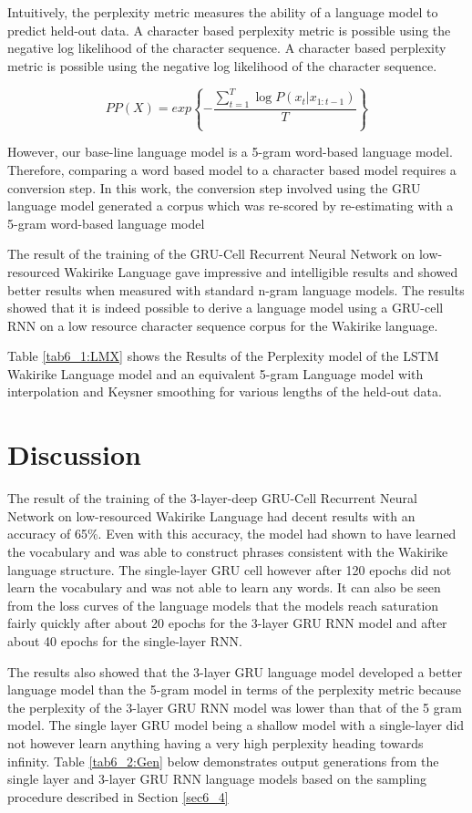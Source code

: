 Intuitively, the perplexity metric measures the ability of a language model to predict held-out data.  A character based perplexity metric is possible using  the negative log likelihood of the character sequence.  A character based perplexity metric is possible using  the negative log likelihood of the character sequence.

\begin{equation}
    PP(X)=exp\left\{−\frac{\sum_{t=1}^T\log P(x_t|x_{1:t−1})}{T}\right\}
\label{ch5_eq3_ppx}
\end{equation}

However, our base-line language model is a 5-gram word-based language model.  Therefore, comparing a word based model to a character based model requires a conversion step. In this work, the conversion step involved using the GRU language model generated a corpus which was re-scored by re-estimating with a 5-gram word-based language model

The result of the training of the GRU-Cell Recurrent Neural Network on low-resourced Wakirike Language gave impressive and intelligible results and showed better results when measured with standard n-gram language models. The results showed that it is indeed possible to derive a language model using a GRU-cell RNN on a low resource character sequence corpus for the Wakirike language.
\stopblue

Table \ref{tab6_1:LMX} shows the Results of the Perplexity model of the LSTM Wakirike Language model and an equivalent 5-gram Language model with interpolation and Keysner smoothing \citep{chen1996empirical} for various lengths of the held-out data.
\startblue
\section{Discussion}
The result of the training of the 3-layer-deep GRU-Cell Recurrent Neural Network on low-resourced Wakirike Language had decent results with an accuracy of 65\%.  Even with this accuracy, the model had shown to have learned the vocabulary and was able to construct phrases consistent with the Wakirike language structure.  The single-layer GRU cell however after 120 epochs did not learn the vocabulary and was not able to learn any words.  It can also be seen from the loss curves of the language models that the models reach saturation fairly quickly after about 20 epochs for the 3-layer GRU RNN model and after about 40 epochs for the single-layer RNN.


The results also showed that the 3-layer GRU language model developed a better language model than the 5-gram model in terms of the perplexity metric because the perplexity of the 3-layer GRU RNN model was lower than that of the 5 gram model.  The single layer GRU model being a shallow model with a single-layer did not however learn anything having a  very high perplexity heading towards infinity.  Table \ref{tab6_2:Gen} below demonstrates output generations from the single layer and 3-layer GRU RNN language models based on the sampling procedure described in Section \ref{sec6_4}

